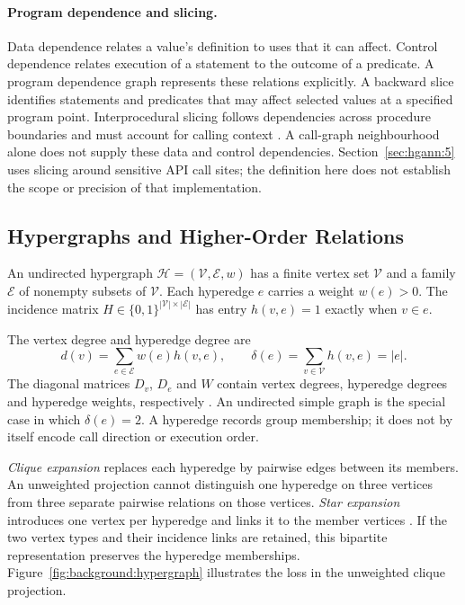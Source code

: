 \paragraph{Program dependence and slicing.} Data dependence relates a value's definition to
uses that it can affect. Control dependence relates execution of a statement to the outcome
of a predicate. A program dependence graph represents these relations explicitly.
A backward slice identifies statements and predicates that may affect selected values at a
specified program point. Interprocedural slicing follows dependencies across procedure
boundaries and must account for calling context \cite{horwitz1990interprocedural}.
A call-graph neighbourhood alone does not supply these data and control dependencies.
Section~\ref{sec:hgann:5} uses slicing around sensitive API call sites; the definition here
does not establish the scope or precision of that implementation.

\subsection{Hypergraphs and Higher-Order Relations}
\label{sec:background:graphs:hypergraphs}

An undirected hypergraph $\mathcal{H} = (\mathcal{V}, \mathcal{E}, w)$ has a finite vertex set
$\mathcal{V}$ and a family $\mathcal{E}$ of nonempty subsets of $\mathcal{V}$. Each hyperedge
$e$ carries a weight $w(e)>0$. The incidence matrix
$H\in\{0,1\}^{|\mathcal{V}|\times|\mathcal{E}|}$ has entry $h(v,e)=1$ exactly when $v\in e$.

The vertex degree and hyperedge degree are
\[
  d(v)=\sum_{e\in\mathcal{E}}w(e)h(v,e),
  \qquad
  \delta(e)=\sum_{v\in\mathcal{V}}h(v,e)=|e|.
\]
The diagonal matrices $D_v$, $D_e$ and $W$
contain vertex degrees, hyperedge degrees and hyperedge weights, respectively
\cite{zhou2006learning}. An undirected simple graph is the special case in which
$\delta(e)=2$. A hyperedge records group membership; it does not by itself encode call
direction or execution order.

\emph{Clique expansion} replaces each hyperedge by pairwise edges between its members.
An unweighted projection cannot distinguish one hyperedge on three vertices from three
separate pairwise relations on those vertices. \emph{Star expansion} introduces one vertex
per hyperedge and links it to the member vertices \cite{agarwal2006higherorder}. If the two
vertex types and their incidence links are retained, this bipartite representation preserves
the hyperedge memberships. Figure~\ref{fig:background:hypergraph} illustrates the loss in the
unweighted clique projection.

